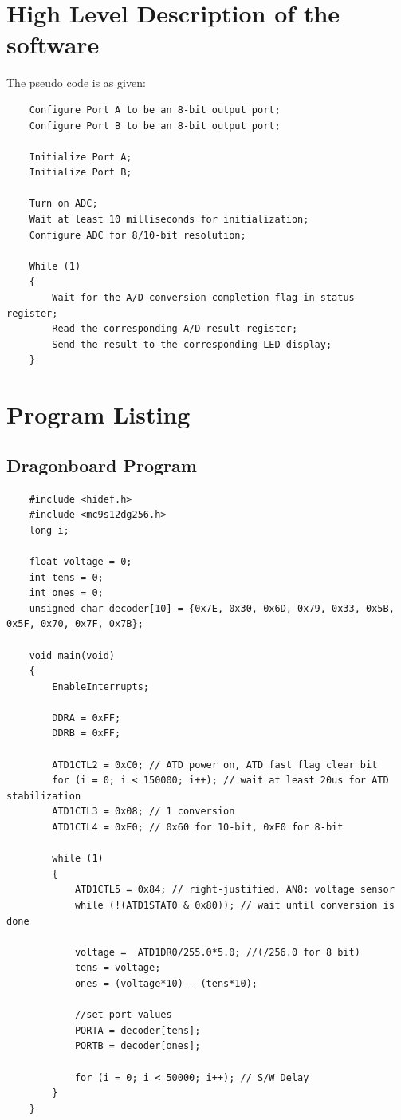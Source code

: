 \documentclass{article}
\begin{document}
	\section*{High Level Description of the software}
	\par
	The pseudo code is as given:
	\begin{lstlisting}
	Configure Port A to be an 8-bit output port;
	Configure Port B to be an 8-bit output port;
	
	Initialize Port A;
	Initialize Port B;
	
	Turn on ADC;
	Wait at least 10 milliseconds for initialization;
	Configure ADC for 8/10-bit resolution;
	
	While (1)
	{	
		Wait for the A/D conversion completion flag in status register;
		Read the corresponding A/D result register;
		Send the result to the corresponding LED display;
	}
	\end{lstlisting}
	\section*{Program Listing}
	\subsection*{Dragonboard Program}
	\begin{lstlisting}
	#include <hidef.h>
	#include <mc9s12dg256.h>
	long i;
		
	float voltage = 0;
	int tens = 0;
	int ones = 0;
	unsigned char decoder[10] = {0x7E, 0x30, 0x6D, 0x79, 0x33, 0x5B, 0x5F, 0x70, 0x7F, 0x7B};
		
	void main(void) 
	{
		EnableInterrupts;
		
		DDRA = 0xFF;
		DDRB = 0xFF;
		
		ATD1CTL2 = 0xC0; // ATD power on, ATD fast flag clear bit
		for (i = 0; i < 150000; i++); // wait at least 20us for ATD stabilization
		ATD1CTL3 = 0x08; // 1 conversion
		ATD1CTL4 = 0xE0; // 0x60 for 10-bit, 0xE0 for 8-bit
		
		while (1) 
		{
			ATD1CTL5 = 0x84; // right-justified, AN8: voltage sensor
			while (!(ATD1STAT0 & 0x80)); // wait until conversion is done
		
			voltage =  ATD1DR0/255.0*5.0; //(/256.0 for 8 bit)
			tens = voltage;
			ones = (voltage*10) - (tens*10);
		
			//set port values
			PORTA = decoder[tens];
			PORTB = decoder[ones];
		
			for (i = 0; i < 50000; i++); // S/W Delay
		}
	}
		
	\end{lstlisting}
\end{document}
